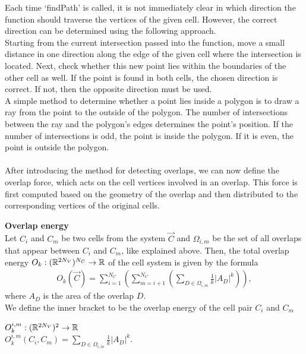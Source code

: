 Each time `findPath' is called, it is not immediately clear in which direction the function should traverse the vertices of the given cell. 
However, the correct direction can be determined using the following approach. \\
Starting from the current intersection passed into the function, move a small distance in one direction along the edge of the given cell where the intersection is located. Next, check whether this new point lies within the boundaries of the other cell as well. 
If the point is found in both cells, the chosen direction is correct. 
If not, then the opposite direction must be used. \\ 
A simple method to determine whether a point lies inside a polygon is to draw a ray from the point to the outside of the polygon. 
The number of intersections between the ray and the polygon's edges determines the point's position. 
If the number of intersections is odd, the point is inside the polygon.
If it is even, the point is outside the polygon. \\ 
\smallskip  \\
After introducing the method for detecting overlaps, we can now define the overlap force, which acts on the cell vertices involved in an overlap. 
This force is first computed based on the geometry of the overlap and then distributed to the corresponding vertices of the original cells. 

\begin{definition} \textbf{Overlap energy} \\
	Let $C_i$ and $C_m$ be two cells from the system $\vec{C}$ and $\Omega_{i,m}$ be the set of all overlaps that appear between $C_i$ and $C_m$, like explained above. Then, the total overlap energy $O_k : (\mathbb{R}^{2N_V})^{N_C} \rightarrow \mathbb{R}$ of the cell system is given by the formula 
	\begin{align}
		O_k(\vec{C}) = \sum\limits_{i=1}^{N_C} \left( \sum\limits_{m=i+1}^{N_C} \left(\sum\limits_{D \in \Omega_{i,m}} \frac{1}{k}|A_{D}|^k\right) \right),		
	\end{align} 
	where $A_{D}$ is the area of the overlap $D$.  \\
	We define the inner bracket to be the overlap energy of the cell pair $C_i$ and $C_m$
	\begin{center}
		$O_k^{i,m}: (\mathbb{R}^{2 N_V})^2 \rightarrow \mathbb{R}$ \\[0.5em]
		$O_k^{i,m}(C_i, C_m) = \sum\limits_{D \in \Omega_{i,m}} \frac{1}{k}|A_{D}|^k.$
	\end{center} 
\end{definition}

